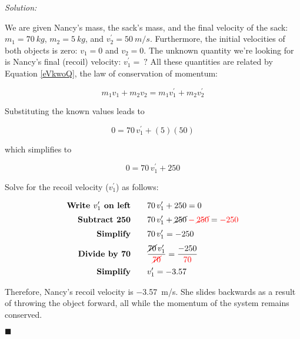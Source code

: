 \documentclass[dvipsnames]{article}
\begin{document}
\textit{Solution:} 

We are given Nancy's mass, the sack's mass, and the final velocity of the sack: $m_1 = \SI{70}{kg}$, $m_2 = \SI{5}{kg}$, and $v_2^{\prime} = \SI{50}{m/s}$. Furthermore, the initial velocities of both objects is zero: $v_1 = 0$ and $v_2 = 0$. The unknown quantity we're looking for is Nancy's final (recoil) velocity: $v_1^{\prime} =\ ?$ All these quantities are related by Equation \ref{eVkwoQ}, the law of conservation of momentum:

\begin{equation*}
    m_1 v_1 + m_2 v_2 = m_1 v_1^{\prime} + m_2 v_2^{\prime}
\end{equation*}

Substituting the known values leads to 

\begin{equation*}
    0 = 70\,v_1^{\prime} + (5)(50)
\end{equation*}

 which simplifies to 

 \begin{equation*}
     0 = 70\,v_1^{\prime} + 250
 \end{equation*}

 Solve for the recoil velocity ($v_1^{\prime}$) as follows:

 \begin{align*}
     \textbf{Write $v_1^{\prime}$ on left} \qquad & 70\,v_1^{\prime} + 250 = 0\\[0.5ex]
     \textbf{Subtract 250} \qquad & 70\,v_1^{\prime} + \cancel{250} \mathbin{\color{red} - } \textcolor{red}{\cancel{250}} = \mathbin{\color{red} - } \textcolor{red}{250}\\[0.5ex]
     \textbf{Simplify} \qquad &  70\,v_1^{\prime} = -250\\[0.5ex]
     \textbf{Divide by 70} \qquad & \frac{\cancel{70}\,v_1^{\prime}}{\textcolor{red}{\cancel{70}}} = \frac{-250}{\textcolor{red}{70}}\\[0.5ex]
     \textbf{Simplify} \qquad & v_1^{\prime} = -3.57\\
 \end{align*}

Therefore, Nancy's recoil velocity is \SI{-3.57}{m/s}. She slides backwards as a result of throwing the object forward, all while the momentum of the system remains conserved.
 
\hfill $\blacksquare$ 
\end{document}
